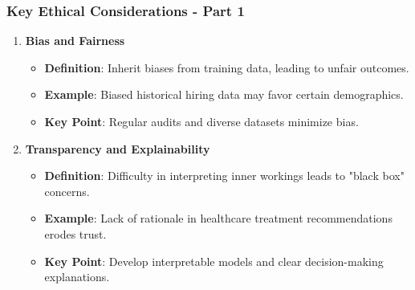 \documentclass[aspectratio=169]{beamer}
\begin{document}
\begin{frame}[fragile]
    \frametitle{Key Ethical Considerations - Part 1}
    \begin{enumerate}
        \item \textbf{Bias and Fairness}
            \begin{itemize}
                \item \textbf{Definition}: Inherit biases from training data, leading to unfair outcomes.
                \item \textbf{Example}: Biased historical hiring data may favor certain demographics.
                \item \textbf{Key Point}: Regular audits and diverse datasets minimize bias.
            \end{itemize}
        
        \item \textbf{Transparency and Explainability}
            \begin{itemize}
                \item \textbf{Definition}: Difficulty in interpreting inner workings leads to "black box" concerns.
                \item \textbf{Example}: Lack of rationale in healthcare treatment recommendations erodes trust.
                \item \textbf{Key Point}: Develop interpretable models and clear decision-making explanations.
            \end{itemize}
    \end{enumerate}
\end{frame}
\end{document}
